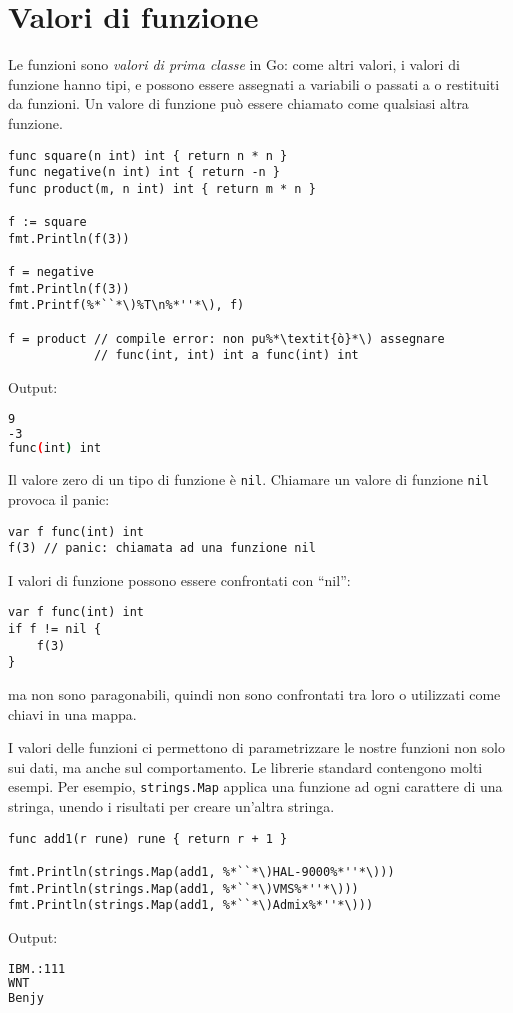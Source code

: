 \section{Valori di funzione}
\label{sec:valori_di_funzione}%
Le funzioni sono \textit{valori di prima classe} in Go: come altri valori, i valori di funzione hanno tipi, e possono essere assegnati a variabili o passati a o restituiti da funzioni.
Un valore di funzione può essere chiamato come qualsiasi altra funzione.
\begin{lstlisting}[frame=single, label={lst:lstlisting4-5.1}]
func square(n int) int { return n * n }
func negative(n int) int { return -n }
func product(m, n int) int { return m * n }

f := square
fmt.Println(f(3))

f = negative
fmt.Println(f(3))
fmt.Printf(%*``*\)%T\n%*''*\), f)

f = product // compile error: non pu%*\textit{ò}*\) assegnare
            // func(int, int) int a func(int) int
\end{lstlisting}
Output:
\begin{lstlisting}[language=bash, frame=L, label={lst:lstlisting4-5.2}]
9
-3
func(int) int
\end{lstlisting}
Il valore zero di un tipo di funzione è \verb|nil|.
Chiamare un valore di funzione \verb|nil| provoca il panic:
\begin{lstlisting}[frame=single, label={lst:lstlisting4-5.3}]
var f func(int) int
f(3) // panic: chiamata ad una funzione nil
\end{lstlisting}
I valori di funzione possono essere confrontati con ``nil'':
\begin{lstlisting}[frame=single, label={lst:lstlisting4-5.4}]
var f func(int) int
if f != nil {
    f(3)
}
\end{lstlisting}
ma non sono paragonabili, quindi non sono confrontati tra loro o utilizzati come chiavi in una mappa.

I valori delle funzioni ci permettono di parametrizzare le nostre funzioni non solo sui dati, ma anche sul comportamento.
Le librerie standard contengono molti esempi.
Per esempio, \verb|strings.Map| applica una funzione ad ogni carattere di una stringa, unendo i risultati per creare un'altra stringa.
\begin{lstlisting}[frame=single, label={lst:lstlisting4-5.5}]
func add1(r rune) rune { return r + 1 }

fmt.Println(strings.Map(add1, %*``*\)HAL-9000%*''*\)))
fmt.Println(strings.Map(add1, %*``*\)VMS%*''*\)))
fmt.Println(strings.Map(add1, %*``*\)Admix%*''*\)))
\end{lstlisting}
Output:
\begin{lstlisting}[language=bash, frame=L, label={lst:lstlisting4-5.6}]
IBM.:111
WNT
Benjy
\end{lstlisting}


